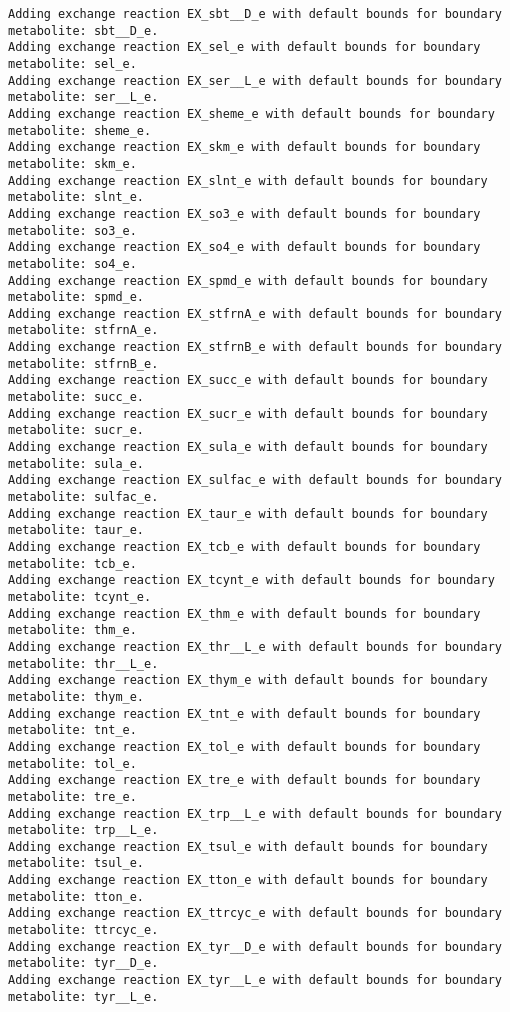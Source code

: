 \documentclass[
  letterpaper,
  DIV=11,
  numbers=noendperiod]{scrartcl}
\begin{document}
\begin{verbatim}
Adding exchange reaction EX_sbt__D_e with default bounds for boundary metabolite: sbt__D_e.
Adding exchange reaction EX_sel_e with default bounds for boundary metabolite: sel_e.
Adding exchange reaction EX_ser__L_e with default bounds for boundary metabolite: ser__L_e.
Adding exchange reaction EX_sheme_e with default bounds for boundary metabolite: sheme_e.
Adding exchange reaction EX_skm_e with default bounds for boundary metabolite: skm_e.
Adding exchange reaction EX_slnt_e with default bounds for boundary metabolite: slnt_e.
Adding exchange reaction EX_so3_e with default bounds for boundary metabolite: so3_e.
Adding exchange reaction EX_so4_e with default bounds for boundary metabolite: so4_e.
Adding exchange reaction EX_spmd_e with default bounds for boundary metabolite: spmd_e.
Adding exchange reaction EX_stfrnA_e with default bounds for boundary metabolite: stfrnA_e.
Adding exchange reaction EX_stfrnB_e with default bounds for boundary metabolite: stfrnB_e.
Adding exchange reaction EX_succ_e with default bounds for boundary metabolite: succ_e.
Adding exchange reaction EX_sucr_e with default bounds for boundary metabolite: sucr_e.
Adding exchange reaction EX_sula_e with default bounds for boundary metabolite: sula_e.
Adding exchange reaction EX_sulfac_e with default bounds for boundary metabolite: sulfac_e.
Adding exchange reaction EX_taur_e with default bounds for boundary metabolite: taur_e.
Adding exchange reaction EX_tcb_e with default bounds for boundary metabolite: tcb_e.
Adding exchange reaction EX_tcynt_e with default bounds for boundary metabolite: tcynt_e.
Adding exchange reaction EX_thm_e with default bounds for boundary metabolite: thm_e.
Adding exchange reaction EX_thr__L_e with default bounds for boundary metabolite: thr__L_e.
Adding exchange reaction EX_thym_e with default bounds for boundary metabolite: thym_e.
Adding exchange reaction EX_tnt_e with default bounds for boundary metabolite: tnt_e.
Adding exchange reaction EX_tol_e with default bounds for boundary metabolite: tol_e.
Adding exchange reaction EX_tre_e with default bounds for boundary metabolite: tre_e.
Adding exchange reaction EX_trp__L_e with default bounds for boundary metabolite: trp__L_e.
Adding exchange reaction EX_tsul_e with default bounds for boundary metabolite: tsul_e.
Adding exchange reaction EX_tton_e with default bounds for boundary metabolite: tton_e.
Adding exchange reaction EX_ttrcyc_e with default bounds for boundary metabolite: ttrcyc_e.
Adding exchange reaction EX_tyr__D_e with default bounds for boundary metabolite: tyr__D_e.
Adding exchange reaction EX_tyr__L_e with default bounds for boundary metabolite: tyr__L_e.

\end{verbatim}
\end{document}
